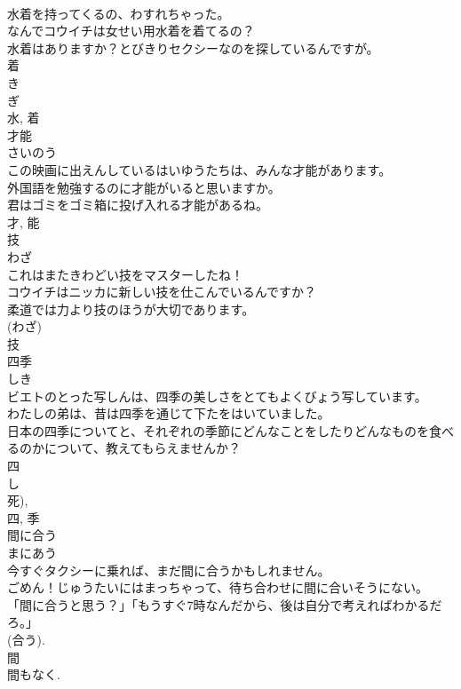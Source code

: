 \documentclass[8pt]{extreport}
\begin{document}
\begin{CJK}{UTF8}{min}
\\	水着を持ってくるの、わすれちゃった。	
\\	なんでコウイチは女せい用水着を着てるの？	
\\	水着はありますか？とびきりセクシーなのを探しているんですが。	
\\	着 
\\	き 
\\	ぎ 
\\	水, 着	
\\	才能	
\\	さいのう	
\\	この映画に出えんしているはいゆうたちは、みんな才能があります。	
\\	外国語を勉強するのに才能がいると思いますか。	
\\	君はゴミをゴミ箱に投げ入れる才能があるね。	
\\	才, 能	
\\	技	
\\	わざ	
\\	これはまたきわどい技をマスターしたね！	
\\	コウイチはニッカに新しい技を仕こんでいるんですか？	
\\	柔道では力より技のほうが大切であります。	
\\	(わざ) 
\\	技	
\\	四季	
\\	しき	
\\	ビエトのとった写しんは、四季の美しさをとてもよくびょう写しています。	
\\	わたしの弟は、昔は四季を通じて下たをはいていました。	
\\	日本の四季についてと、それぞれの季節にどんなことをしたりどんなものを食べるのかについて、教えてもらえませんか？	
\\	四 
\\	し 
\\	死), 
\\	四, 季	
\\	間に合う	
\\	まにあう	
\\	今すぐタクシーに乗れば、まだ間に合うかもしれません。	
\\	ごめん！じゅうたいにはまっちゃって、待ち合わせに間に合いそうにない。	
\\	「間に合うと思う？」「もうすぐ7時なんだから、後は自分で考えればわかるだろ。」	
\\	(合う). 
\\	間 
\\	間もなく. 

\end{CJK}
\end{document}
